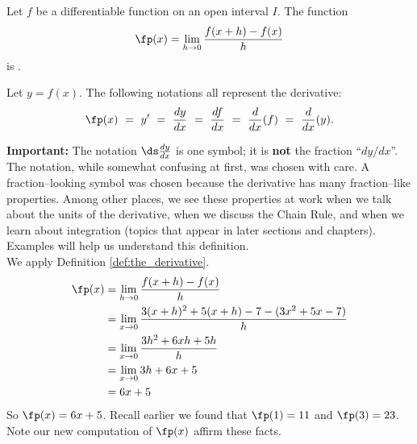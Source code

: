 {Let $f$ be a differentiable function on an open interval $I$. The function 
\[
\fp(x) = \lim_{h\to 0} \frac{f(x+h)-f(x)}{h}
\]
 is .\\


Let $y = f(x)$. The following notations all represent the derivative:
\[
\fp(x)\ =\ y'\ =\ \frac{dy}{dx}\ =\ \frac{df}{dx}\ =\ \frac{d}{dx}(f)\ =\ \frac{d}{dx}(y). 
\]}
\setlength{\specialboxlength}{\textwidth-2\specialboxinnerseplength}

\noindent\textbf{Important:} The notation $\ds \frac{dy}{dx}$ is one symbol; it is \textbf{not} the fraction ``$dy/dx$''. The notation, while somewhat confusing at first, was chosen with care. A fraction--looking symbol was chosen because the derivative has many fraction--like properties. Among other places, we see these properties at work when we talk about the units of the derivative, when we discuss the Chain Rule, and when we learn about integration (topics that appear in later sections and chapters).\\

Examples will help us understand this definition.\\

{We apply Definition \ref{def:the_derivative}.
	\begin{align*}
	\fp(x) &= \lim_{h\to 0} \frac{f(x+h)-f(x)}{h} \\
					&=	\lim_{x\to 0} \frac{3(x+h)^2+5(x+h)-7-(3x^2+5x-7)}{h}\\
					&=	\lim_{x\to 0} \frac{3h^2 +6xh+5h}{h}\\
					&= \lim_{x\to 0} 3h+6x+5\\
					&= 6x+5
	\end{align*}
	So $\fp(x) = 6x+5$. Recall earlier we found that $\fp(1) = 11$ and $\fp(3) = 23$. Note our new computation of $\fp(x)$ affirm these facts.
}\\

